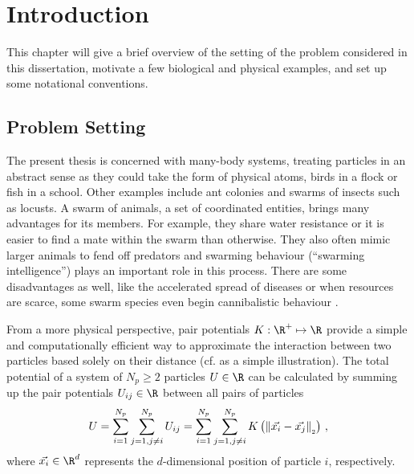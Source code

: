 \chapter{Introduction}
\label{chap:introduction}

This chapter will give a brief overview of the setting of the problem considered in this dissertation, motivate a few biological and physical examples, and set up some notational conventions.

\section{Problem Setting}
The present thesis is concerned with many-body systems, treating particles in an abstract sense as they could take the form of physical atoms, birds in a flock or fish in a school.
Other examples include ant colonies and swarms of insects such as locusts.
A swarm of animals, a set of coordinated entities, brings many advantages for its members.
For example, they share water resistance or it is easier to find a mate within the swarm than otherwise.
They also often mimic larger animals to fend off predators and swarming behaviour (``swarming intelligence'') plays an important role in this process.
There are some disadvantages as well, like the accelerated spread of diseases or when resources are scarce, some swarm species even begin cannibalistic behaviour \parencite{2017-maria-orsogna-swarm-video}.

From a more physical perspective, pair potentials $K: \R^+ \mapsto \R$ provide a simple and computationally efficient way to approximate the interaction between two particles based solely on their distance (cf.  as a simple illustration).
The total potential of a system of $N_p \ge 2$ particles $U \in \R$ can be calculated by summing up the pair potentials $U_{ij} \in \R$ between all pairs of particles
$$U = \sum_{i=1}^{N_p}\sum_{j=1, j \neq i}^{N_p} U_{ij} = \sum_{i=1}^{N_p}\sum_{j=1, j \neq i}^{N_p} K\left(\left\lVert\vec{x_i} - \vec{x_j}\right\rVert_{\scriptscriptstyle 2}\right)\,,$$
where $\vec{x_i} \in \R^d$ represents the $d$-dimensional position of particle $i$, respectively.

